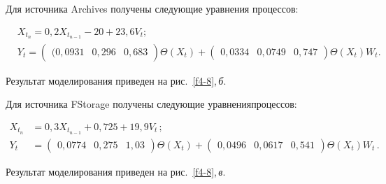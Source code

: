       


      Для источника Archives получены следующие уравнения процессов:


      \begin{align*}


    &  X_{t_n} =0{,}2X_{t_{n-1}}-20+23{,}6V_t;\\


     & Y_t = \begin{pmatrix}(0{,}0931 & 0{,}296 & 0{,}683\end{pmatrix}


      \Theta(X_t)+


      \begin{pmatrix}0{,}0334 & 0{,}0749 & 0{,}747


      \end{pmatrix} \Theta(X_t) W_t.


      \end{align*}


      


      Результат моделирования приведен на рис.~\ref{f4-8},\,\textit{б}.


      





      Для источника FStorage получены следующие уравнения\linebreak процессов:


      \begin{align*}


      X_{t_n} &=0{,}3X_{t_{n-1}}+0{,}725+19{,}9V_t\,;\\


      Y_t &= \begin{pmatrix}0{,}0774 & 0{,}275 & 1{,}03\end{pmatrix}


      \Theta(X_t)+\begin{pmatrix}0{,}0496 & 0{,}0617 & 0{,}541


      \end{pmatrix} \Theta(X_t) W_t\,.


      \end{align*}


      


      


      Результат моделирования приведен на рис.~\ref{f4-8},\,\textit{в}.


      





